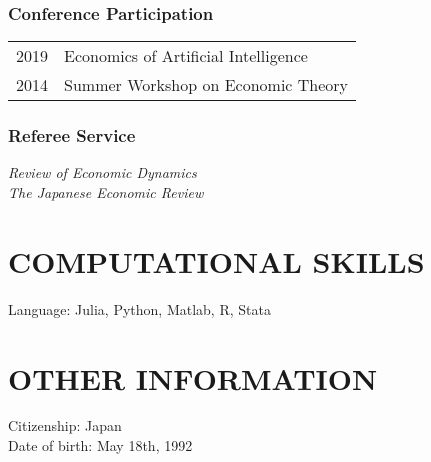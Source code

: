 \documentclass[12pt]{article}
\begin{document}
\subsubsection*{Conference Participation}
\begin{tabular}{@{}ll}
2019&Economics of Artificial Intelligence\\
2014&Summer Workshop on Economic Theory
\end{tabular}
\subsubsection*{Referee Service}
\textit{Review of Economic Dynamics}\\
\textit{The Japanese Economic Review}

\section*{COMPUTATIONAL SKILLS}
Language: Julia, Python, Matlab, R, Stata

\section*{OTHER INFORMATION}
Citizenship: Japan\\
Date of birth: May 18th, 1992
\end{document}
